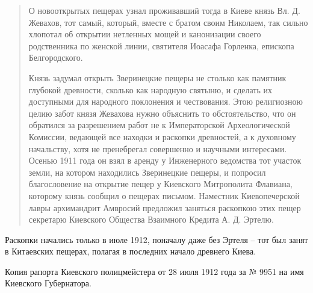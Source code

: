 \begin{quotation}
О новооткрытых пещерах узнал проживавший тогда в Киеве князь Вл. Д. Жевахов, тот самый, который, вместе с братом своим Николаем, так сильно хлопотал об открытии нетленных мощей и канонизации своего родственника по женской линии, святителя Иоасафа Горленка, епископа Белгородского.

Князь задумал открыть Зверинецкие пещеры не столько как памятник глубокой древности, сколько как народную святыню, и сделать их доступными для народного поклонения и чествования. Этою религиозною целию забот князя Жевахова нужно объяснить то обстоятельство, что он обратился за разрешением работ не к Императорской Археологической Комиссии, ведающей все находки и раскопки древностей, а к духовному начальству, хотя не пренебрегал совершенно и научными интересами. Осенью 1911 года он взял в аренду у Инженерного ведомства тот участок земли, на котором находились Зверинецкие пещеры, и попросил благословение на открытие пещер у Киевского Митрополита Флавиана, которому князь сообщил о пещерах письмом. Наместник Киевопечерской лавры архимандрит Амвросий предложил заняться раскопкою этих пещер секретарю Киевского Общества Взаимного Кредита А. Д. Эртелю.
\end{quotation}

Раскопки начались только в июле 1912, поначалу даже без Эртеля – тот был занят в Китаевских пещерах, полагая в последних начало древнего Киева.

Копия рапорта Киевского полицмейстера от 28 июля 1912 года за № 9951 на имя Киевского Губернатора.

